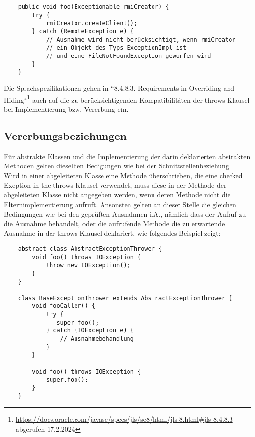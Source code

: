 \begin{verbatim}
    public void foo(Exceptionable rmiCreator) {
        try {
            rmiCreator.createClient();
        } catch (RemoteException e) {
            // Ausnahme wird nicht berücksichtigt, wenn rmiCreator
            // ein Objekt des Typs ExceptionImpl ist
            // und eine FileNotFoundException geworfen wird
        }
    }
\end{verbatim}

Die Sprachspezifikationen gehen in ``8.4.8.3. Requirements in Overriding and Hiding``\footnote{
    \url{https://docs.oracle.com/javase/specs/jls/se8/html/jls-8.html#jls-8.4.8.3} - abgerufen 17.2.2024
} auch auf die zu berücksichtigenden Kompatibilitäten der throws-Klausel bei Implementierung bzw. Vererbung ein.

\subsection{Vererbungsbeziehungen}

Für abstrakte Klassen und die Implementierung der darin deklarierten abstrakten Methoden gelten dieselben Bedigungen wie bei der Schnittstellenbeziehung.\\

\noindent
Wird in einer abgeleiteten Klasse eine Methode überschrieben, die eine checked Exeption in the throws-Klausel verwendet, muss diese in der Methode der abgeleiteten Klasse nicht angegeben werden, wenn deren Methode nicht die Elternimplementierung aufruft. Ansonsten gelten an dieser Stelle die gleichen Bedingungen wie bei den geprüften Ausnahmen i.A., nämlich dass der Aufruf zu  die Ausnahme behandelt, oder die aufrufende Methode die zu erwartende Ausnahme in der throws-Klausel deklariert, wie folgendes Beispiel zeigt:

\begin{verbatim}
    abstract class AbstractExceptionThrower {
        void foo() throws IOException {
            throw new IOException();
        }
    }

    class BaseExceptionThrower extends AbstractExceptionThrower {
        void fooCaller() {
            try {
               super.foo();
            } catch (IOException e) {
                // Ausnahmebehandlung
            }
        }

        void foo() throws IOException {
            super.foo();
        }
    }
\end{verbatim}

